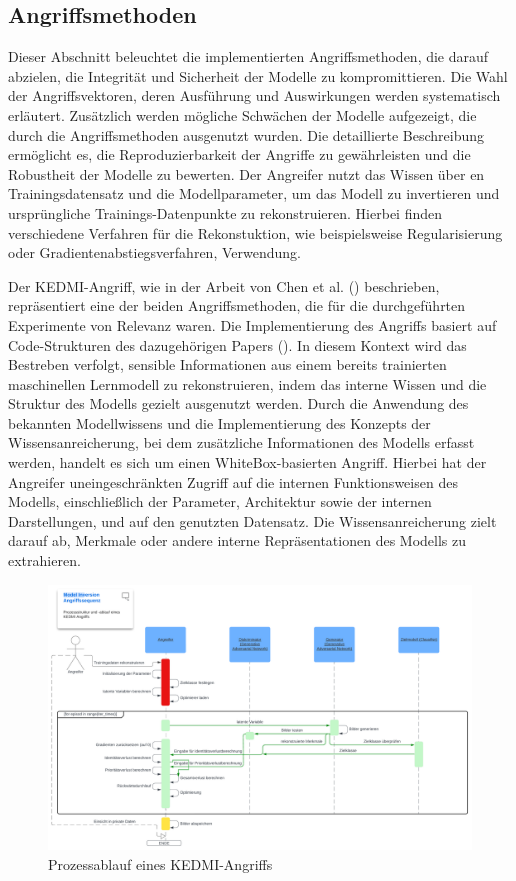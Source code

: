 \subsection{Angriffsmethoden}
Dieser Abschnitt beleuchtet die implementierten Angriffsmethoden, die darauf abzielen, die Integrität und Sicherheit der Modelle zu kompromittieren. Die Wahl der Angriffsvektoren, deren Ausführung und Auswirkungen werden systematisch erläutert. Zusätzlich werden mögliche Schwächen der Modelle aufgezeigt, die durch die Angriffsmethoden ausgenutzt wurden. Die detaillierte Beschreibung ermöglicht es, die Reproduzierbarkeit der Angriffe zu gewährleisten und die Robustheit der Modelle zu bewerten. Der Angreifer nutzt das Wissen über en Trainingsdatensatz und die Modellparameter, um das Modell zu invertieren und ursprüngliche Trainings-Datenpunkte zu rekonstruieren. Hierbei finden verschiedene Verfahren für die Rekonstuktion, wie beispielsweise Regularisierung oder Gradientenabstiegsverfahren, Verwendung.

Der \glqq KEDMI\grqq-Angriff, wie in der Arbeit von Chen et al. (\cite{chen_knowledge-enriched_2021}) beschrieben, repräsentiert eine der beiden Angriffsmethoden, die für die durchgeführten Experimente von Relevanz waren. Die Implementierung des Angriffs basiert auf Code-Strukturen des dazugehörigen Papers (\cite{chen_knowledge-enriched_2021}). In diesem Kontext wird das Bestreben verfolgt, sensible Informationen aus einem bereits trainierten maschinellen Lernmodell zu rekonstruieren, indem das interne Wissen und die Struktur des Modells gezielt ausgenutzt werden. Durch die Anwendung des bekannten Modellwissens und die Implementierung des Konzepts der \glqq Wissensanreicherung\grqq, bei dem zusätzliche Informationen des Modells erfasst werden, handelt es sich um einen \glqq WhiteBox-basierten\grqq{} Angriff. Hierbei hat der Angreifer uneingeschränkten Zugriff auf die internen Funktionsweisen des Modells, einschließlich der Parameter, Architektur sowie der internen Darstellungen, und auf den genutzten Datensatz. Die Wissensanreicherung zielt darauf ab, Merkmale oder andere interne Repräsentationen des Modells zu extrahieren.

\begin{figure}
	\centering
	\includegraphics[width=1\linewidth]{Bilder/KEDMI_PROCESS.png}
	\caption{Prozessablauf eines KEDMI-Angriffs}
	\label{img:kedmi_process}
\end{figure}

